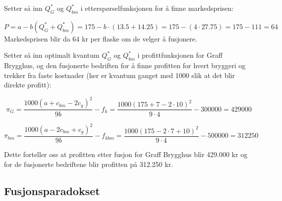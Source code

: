 \documentclass[
  12pt,
  a4paper,
  DIV=11,
  numbers=noendperiod]{scrartcl}
\begin{document}
Setter så inn \(Q_G^*\) og \(Q_{bm}^*\) i etterspørselfunksjonen for å
finne markedsprisen:

\[P = a - b(Q_G^*+Q_{bm}^*) = 175 - b \cdot (13.5 + 14.25) = 175 - (4 \cdot 27.75)  = 175 - 111 = 64 \tag{34}\]
Markedsprisen blir da 64 kr per flaske om de velger å fusjonere.

Setter så inn optimalt kvantum \(Q_G^*\) og \(Q_{bm}^*\) i
profittfunksjonen for Graff Brygghus, og den fusjonerte bedriften for å
finne profitten for hvert bryggeri og trekker fra faste kostnader (her
er kvantum ganget med 1000 slik at det blir direkte profitt):

\[ \pi_G = \frac{1000(a+c_{bm}-2c_g)^2}{9b} -f_k = \frac{1000(175+7 - 2 \cdot 10)^2}{9 \cdot 4} -300000 = 429000 \tag{35}\]

\[ \pi_{bm} = \frac{1000(a-2c_{bm}+c_g)^2}{9b} -f_{kbm} = \frac{1000(175-2 \cdot 7+10)^2}{9 \cdot 4} -500000 = 312250 \tag{36}\]

Dette forteller oss at profitten etter fusjon for Graff Brygghus blir
429.000 kr og for de fusjonerte bedriftene blir profitten på 312.250 kr.

\clearpage

\subsection{Fusjonsparadokset}\label{fusjonsparadokset}
\end{document}

